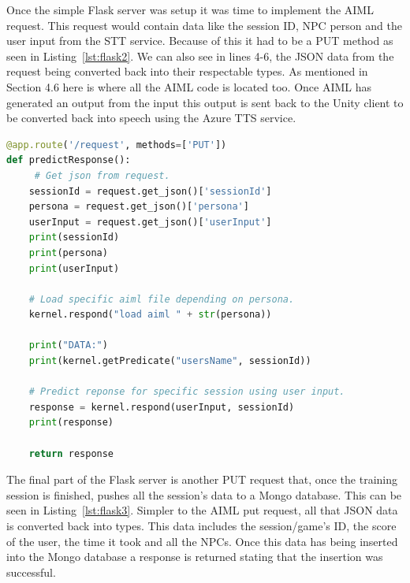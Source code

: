 Once the simple Flask server was setup it was time to implement the AIML request. This request would contain data like the session ID, NPC person and the user input from the STT service. Because of this it had to be a PUT method as seen in Listing~\ref{lst:flask2}. We can also see in lines 4-6, the JSON data from the request being converted back into their respectable types. As mentioned in Section 4.6 here is where all the AIML code is located too. Once AIML has generated an output from the input this output is sent back to the Unity client to be converted back into speech using the Azure TTS service. 

\begin{lstlisting}[caption={Flask PUT request to generate AIML response},label={lst:flask2},language=python]
@app.route('/request', methods=['PUT'])
def predictResponse():
     # Get json from request.
    sessionId = request.get_json()['sessionId']
    persona = request.get_json()['persona']
    userInput = request.get_json()['userInput']
    print(sessionId)
    print(persona)
    print(userInput)

    # Load specific aiml file depending on persona.
    kernel.respond("load aiml " + str(persona))

    print("DATA:")
    print(kernel.getPredicate("usersName", sessionId))

    # Predict reponse for specific session using user input.
    response = kernel.respond(userInput, sessionId)
    print(response)

    return response
\end{lstlisting}

The final part of the Flask server is another PUT request that, once the training session is finished, pushes all the session's data to a Mongo database. This can be seen in Listing~\ref{lst:flask3}. Simpler to the AIML put request, all that JSON data is converted back into types. This data includes the session/game's ID, the score of the user, the time it took and all the NPCs. Once this data has being inserted into the Mongo database a response is returned stating that the insertion was successful. 

